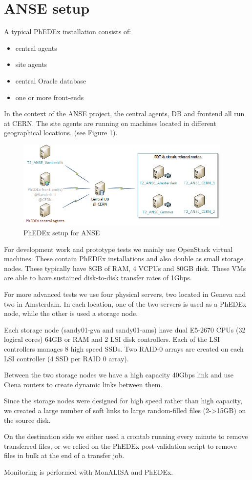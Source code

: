 \section{ANSE setup}

A typical PhEDEx installation consists of:
\begin{itemize}
	\item central agents
	\item site agents
	\item central Oracle database
	\item one or more front-ends \\
\end{itemize}

In the context of the ANSE project, the central agents, DB and frontend all run
at CERN. The site agents are running on machines located in different geographical
locations. (see Figure \ref{fig:ANSE-setup}).

\begin{figure}[h]
  \centering
  \includegraphics[width=0.95\textwidth]{Figures/ANSE-setup.png}
  \caption{PhEDEx setup for ANSE}
  \label{fig:ANSE-setup}
\end{figure}

For development work and prototype tests we mainly use OpenStack virtual machines.
These contain PhEDEx installations and also double as small storage nodes. These
typically have 8GB of RAM, 4 VCPUs and 80GB disk. These VMs are able to have
sustained disk-to-disk transfer rates of 1Gbps.

For more advanced tests we use four physical servers, two located in Geneva and 
two in Amsterdam. In each location, one of the two servers is used as a PhEDEx node, 
while the other is used a storage node.

Each storage node (sandy01-gva and sandy01-ams) have dual E5-2670 CPUs (32 logical cores)
64GB or RAM and 2 LSI disk controllers. Each of the LSI controllers manages
8 high speed SSDs. Two RAID-0 arrays are created on each LSI controller (4 SSD per
RAID 0 array).

Between the two storage nodes we have a high capacity 40Gbps link and use Ciena
routers to create dynamic links between them.

Since the storage nodes were designed for high speed rather than high capacity,
we created a large number of soft links to large random-filled files (2->15GB) 
on the source disk. 

On the destination side we either used a crontab running every minute to remove
transferred files, or we relied on the PhEDEx post-validation  script to remove 
files in bulk at the end of a transfer job.

Monitoring is performed with MonALISA\cite{MonALISA}  and PhEDEx.